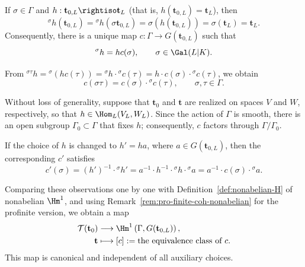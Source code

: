 If $\sigma\in\Gamma$ and
$h:\mathbf{t}_{0,L}\rightiso\mathbf{t}_L$ (that is,
$h(\mathbf{t}_{0,L})=\mathbf{t}_L$), then
\[
{}^\sigma h(\mathbf{t}_{0,L})
={}^\sigma h(\sigma\mathbf{t}_{0,L})
=\sigma(h(\mathbf{t}_{0,L}))
=\sigma(\mathbf{t}_L)
=\mathbf{t}_L.
\]
Consequently, there is a unique map
$c:\Gamma\to G(\mathbf{t}_{0,L})$ such that
\[
{}^\sigma h=hc(\sigma),\qquad \sigma\in\Gal(L|K).
\]

From
${}^{\sigma\tau}h={}^\sigma(hc(\tau))={}^\sigma h\cdot
{}^\sigma c(\tau)=h\cdot c(\sigma)\cdot{}^\sigma c(\tau)$, we obtain
\[
c(\sigma\tau)=c(\sigma)\cdot{}^\sigma c(\tau),
\qquad \sigma,\tau\in\Gamma.
\]

Without loss of generality, suppose that $\mathbf{t}_0$ and $\mathbf{t}$ are
realized on spaces $V$ and $W$, respectively, so that
$h\in\Hom_L(V_L,W_L)$. Since the action of $\Gamma$ is smooth, there is an
open subgroup $\Gamma_0\subset\Gamma$ that fixes $h$; consequently, $c$
factors through $\Gamma/\Gamma_0$.

If the choice of $h$ is changed to $h'=ha$, where
$a\in G(\mathbf{t}_{0,L})$, then the corresponding $c'$ satisfies
\[
c'(\sigma)=(h')^{-1}\cdot{}^\sigma h'
=a^{-1}\cdot h^{-1}\cdot{}^\sigma h\cdot{}^\sigma a
=a^{-1}\cdot c(\sigma)\cdot{}^\sigma a.
\]

Comparing these observations one by one with
Definition~\ref{def:nonabelian-H} of nonabelian $\Hm^1$, and using
Remark~\ref{rem:pro-finite-coh-nonabelian} for the profinite version, we
obtain a map
\begin{equation}\label{eqn:Galois-H1-prep}
	\begin{aligned}
		\mathcal{T}(\mathbf{t}_0)&\longrightarrow
		\Hm^1\left(\Gamma,G(\mathbf{t}_{0,L})\right),\\
		\mathbf{t}&\longmapsto[c]:=\text{the equivalence class of }c.
	\end{aligned}
\end{equation}
This map is canonical and independent of all auxiliary choices.

